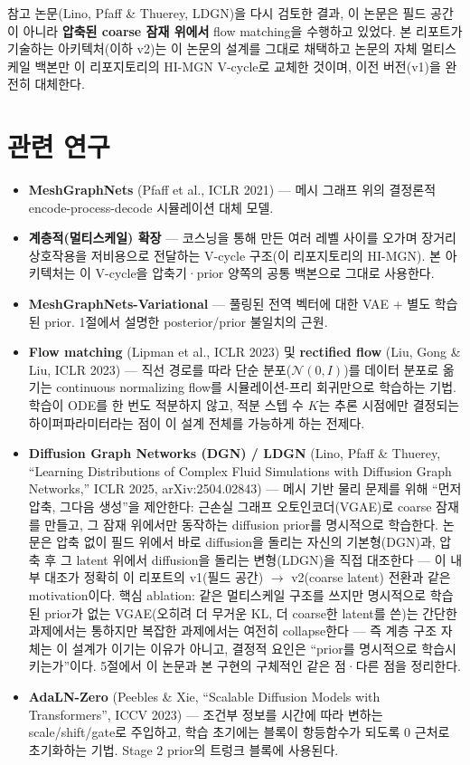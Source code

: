 \documentclass[11pt]{article}
\begin{document}
참고 논문(Lino, Pfaff \& Thuerey, LDGN)을 다시 검토한 결과, 이 논문은 필드
공간이 아니라 \textbf{압축된 coarse 잠재 위에서} flow matching을 수행하고
있었다. 본 리포트가 기술하는 아키텍처(이하 v2)는 이 논문의 설계를 그대로
채택하고 논문의 자체 멀티스케일 백본만 이 리포지토리의 HI-MGN V-cycle로
교체한 것이며, 이전 버전(v1)을 완전히 대체한다.

\section{관련 연구}

\begin{itemize}
\item \textbf{MeshGraphNets} (Pfaff et al., ICLR 2021) --- 메시 그래프
  위의 결정론적 encode-process-decode 시뮬레이션 대체 모델.
\item \textbf{계층적(멀티스케일) 확장} --- 코스닝을 통해 만든 여러 레벨
  사이를 오가며 장거리 상호작용을 저비용으로 전달하는 V-cycle 구조(이
  리포지토리의 HI-MGN). 본 아키텍처는 이 V-cycle을 압축기·prior 양쪽의
  공통 백본으로 그대로 사용한다.
\item \textbf{MeshGraphNets-Variational} --- 풀링된 전역 벡터에 대한
  VAE + 별도 학습된 prior. 1절에서 설명한 posterior/prior 불일치의 근원.
\item \textbf{Flow matching} (Lipman et al., ICLR 2023) 및
  \textbf{rectified flow} (Liu, Gong \& Liu, ICLR 2023) --- 직선 경로를
  따라 단순 분포($\mathcal{N}(0,I)$)를 데이터 분포로 옮기는 continuous
  normalizing flow를 시뮬레이션-프리 회귀만으로 학습하는 기법. 학습이
  ODE를 한 번도 적분하지 않고, 적분 스텝 수 $K$는 추론 시점에만 결정되는
  하이퍼파라미터라는 점이 이 설계 전체를 가능하게 하는 전제다.
\item \textbf{Diffusion Graph Networks (DGN) / LDGN} (Lino, Pfaff \&
  Thuerey, ``Learning Distributions of Complex Fluid Simulations with
  Diffusion Graph Networks,'' ICLR 2025, arXiv:2504.02843) --- 메시 기반
  물리 문제를 위해 ``먼저 압축, 그다음 생성''을 제안한다: 근손실 그래프
  오토인코더(VGAE)로 coarse 잠재를 만들고, 그 잠재 위에서만 동작하는
  diffusion prior를 명시적으로 학습한다. 논문은 압축 없이 필드 위에서
  바로 diffusion을 돌리는 자신의 기본형(DGN)과, 압축 후 그 latent 위에서
  diffusion을 돌리는 변형(LDGN)을 직접 대조한다 --- 이 내부 대조가 정확히
  이 리포트의 v1(필드 공간) $\to$ v2(coarse latent) 전환과 같은
  motivation이다. 핵심 ablation: 같은 멀티스케일 구조를 쓰지만 명시적으로
  학습된 prior가 없는 VGAE(오히려 더 무거운 KL, 더 coarse한 latent를 쓴)는
  간단한 과제에서는 통하지만 복잡한 과제에서는 여전히 collapse한다 ---
  즉 계층 구조 자체는 이 설계가 이기는 이유가 아니고, 결정적 요인은
  ``prior를 명시적으로 학습시키는가''이다. 5절에서 이 논문과 본 구현의
  구체적인 같은 점·다른 점을 정리한다.
\item \textbf{AdaLN-Zero} (Peebles \& Xie, ``Scalable Diffusion Models
  with Transformers'', ICCV 2023) --- 조건부 정보를 시간에 따라 변하는
  scale/shift/gate로 주입하고, 학습 초기에는 블록이 항등함수가 되도록
  0 근처로 초기화하는 기법. Stage 2 prior의 트렁크 블록에 사용된다.
\end{itemize}
\end{document}
